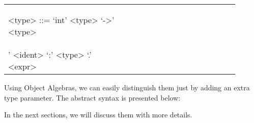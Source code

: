 \begin{tabular}{m{0.45\linewidth}m{0.45\linewidth}}
\setlength{\grammarindent}{5em}
\begin{grammar}
<type> ::= `int' \alt <type> `->' <type>
\end{grammar}
&
\setlength{\grammarindent}{5em}
\begin{grammar}
<expr> ::=  `\\' <ident> `:' <type> `.' <expr>
\end{grammar}
\end{tabular}

Using Object Algebras, we can easily distinguish them just by adding an extra type parameter. The abstract syntax is
presented below:

In the next sections, we will discuss them with more details.

